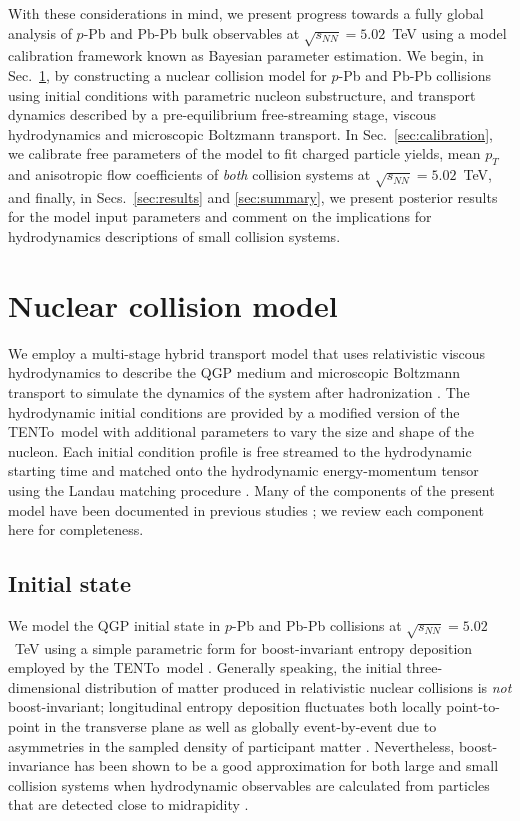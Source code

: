 \documentclass[aps,prc,reprint,amsmath,nofootinbib]{revtex4-1}
\newcommand{\trento}{T\raisebox{-0.5ex}{R}ENTo}
\newcommand{\sqrts}{\sqrt{s_{NN}}}
\begin{document}
With these considerations in mind, we present progress towards a fully global analysis of $p$-Pb and Pb-Pb bulk observables at $\sqrts=5.02$~TeV using a model calibration framework known as Bayesian parameter estimation.
We begin, in Sec.~\ref{sec:model}, by constructing a nuclear collision model for $p$-Pb and Pb-Pb collisions using initial conditions with parametric nucleon substructure, and transport dynamics described by a pre-equilibrium free-streaming stage, viscous hydrodynamics and microscopic Boltzmann transport.
In Sec.~\ref{sec:calibration}, we calibrate free parameters of the model to fit charged particle yields, mean $p_T$ and anisotropic flow coefficients of \emph{both} collision systems at $\sqrts=5.02$~TeV, and finally, in Secs.~\ref{sec:results} and \ref{sec:summary}, we present posterior results for the model input parameters and comment on the implications for hydrodynamics descriptions of small collision systems.


\section{Nuclear collision model}
\label{sec:model}

We employ a multi-stage hybrid transport model that uses relativistic viscous hydrodynamics to describe the QGP medium and microscopic Boltzmann transport to simulate the dynamics of the system after hadronization \cite{Shen:2014vra, Bernhard:2016tnd}.
The hydrodynamic initial conditions are provided by a modified version of the \trento\ model \cite{Moreland:2014oya} with additional parameters to vary the size and shape of the nucleon.
Each initial condition profile is free streamed to the hydrodynamic starting time and matched onto the hydrodynamic energy-momentum tensor using the Landau matching procedure \cite{Broniowski:2008qk, Heinz:2015arc}.
Many of the components of the present model have been documented in previous studies \cite{Moreland:2014oya, Bernhard:2016tnd, Bernhard:2018hnz}; we review each component here for completeness.

\subsection{Initial state}
\label{sec:initial_state}

We model the QGP initial state in $p$-Pb and Pb-Pb collisions at $\sqrts=5.02$~TeV using a simple parametric form for boost-invariant entropy deposition employed by the \trento\ model \cite{Moreland:2014oya}.
Generally speaking, the initial three-dimensional distribution of matter produced in relativistic nuclear collisions is \emph{not} boost-invariant; longitudinal entropy deposition fluctuates both locally point-to-point in the transverse plane as well as globally event-by-event due to asymmetries in the sampled density of participant matter \cite{Ke:2016jrd, Bozek:2010vz}.
Nevertheless, boost-invariance has been shown to be a good approximation for both large and small collision systems when hydrodynamic observables are calculated from particles that are detected close to midrapidity \cite{Shen:2016zpp}.
\end{document}
